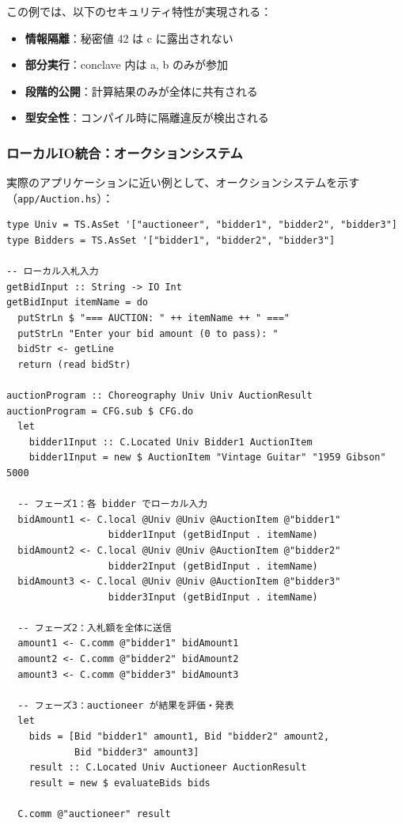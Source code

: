 この例では、以下のセキュリティ特性が実現される：
\begin{itemize}
\item \textbf{情報隔離}：秘密値 42 は c に露出されない
\item \textbf{部分実行}：conclave 内は a, b のみが参加
\item \textbf{段階的公開}：計算結果のみが全体に共有される
\item \textbf{型安全性}：コンパイル時に隔離違反が検出される
\end{itemize}

\subsubsection{ローカルIO統合：オークションシステム}

実際のアプリケーションに近い例として、オークションシステムを示す（\texttt{app/Auction.hs}）：

\begin{verbatim}
type Univ = TS.AsSet '["auctioneer", "bidder1", "bidder2", "bidder3"]
type Bidders = TS.AsSet '["bidder1", "bidder2", "bidder3"]

-- ローカル入札入力
getBidInput :: String -> IO Int
getBidInput itemName = do
  putStrLn $ "=== AUCTION: " ++ itemName ++ " ==="
  putStrLn "Enter your bid amount (0 to pass): "
  bidStr <- getLine
  return (read bidStr)

auctionProgram :: Choreography Univ Univ AuctionResult
auctionProgram = CFG.sub $ CFG.do
  let
    bidder1Input :: C.Located Univ Bidder1 AuctionItem
    bidder1Input = new $ AuctionItem "Vintage Guitar" "1959 Gibson" 5000

  -- フェーズ1：各 bidder でローカル入力
  bidAmount1 <- C.local @Univ @Univ @AuctionItem @"bidder1"
                  bidder1Input (getBidInput . itemName)
  bidAmount2 <- C.local @Univ @Univ @AuctionItem @"bidder2"
                  bidder2Input (getBidInput . itemName)
  bidAmount3 <- C.local @Univ @Univ @AuctionItem @"bidder3"
                  bidder3Input (getBidInput . itemName)

  -- フェーズ2：入札額を全体に送信
  amount1 <- C.comm @"bidder1" bidAmount1
  amount2 <- C.comm @"bidder2" bidAmount2
  amount3 <- C.comm @"bidder3" bidAmount3

  -- フェーズ3：auctioneer が結果を評価・発表
  let
    bids = [Bid "bidder1" amount1, Bid "bidder2" amount2,
            Bid "bidder3" amount3]
    result :: C.Located Univ Auctioneer AuctionResult
    result = new $ evaluateBids bids

  C.comm @"auctioneer" result
\end{verbatim}

